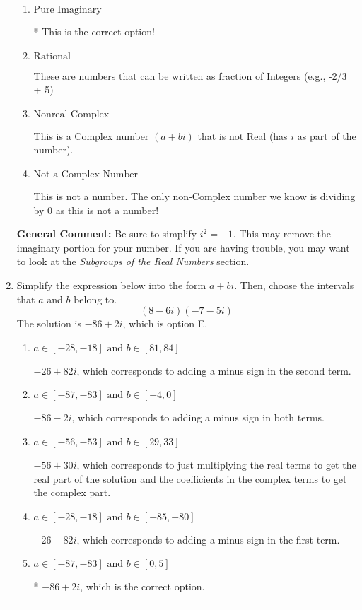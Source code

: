 \documentclass{extbook}[14pt]
\newcommand{\litem}[1]{\item #1

\rule{\textwidth}{0.4pt}}
\begin{document}
\begin{enumerate}
{\begin{enumerate}[label=\Alph*.]
These cannot be written as a fraction of Integers. Remember: $\pi$ is not an Integer!
\item \( \text{Pure Imaginary} \)

* This is the correct option!
\item \( \text{Rational} \)

These are numbers that can be written as fraction of Integers (e.g., -2/3 + 5)
\item \( \text{Nonreal Complex} \)

This is a Complex number $(a+bi)$ that is not Real (has $i$ as part of the number).
\item \( \text{Not a Complex Number} \)

This is not a number. The only non-Complex number we know is dividing by 0 as this is not a number!
\end{enumerate}

\textbf{General Comment:} Be sure to simplify $i^2 = -1$. This may remove the imaginary portion for your number. If you are having trouble, you may want to look at the \textit{Subgroups of the Real Numbers} section.
}
\litem{
Simplify the expression below into the form $a+bi$. Then, choose the intervals that $a$ and $b$ belong to.
\[ (8 - 6 i)(-7 - 5 i) \]The solution is \( -86 + 2 i \), which is option E.\begin{enumerate}[label=\Alph*.]
\item \( a \in [-28, -18] \text{ and } b \in [81, 84] \)

 $-26 + 82 i$, which corresponds to adding a minus sign in the second term.
\item \( a \in [-87, -83] \text{ and } b \in [-4, 0] \)

 $-86 - 2 i$, which corresponds to adding a minus sign in both terms.
\item \( a \in [-56, -53] \text{ and } b \in [29, 33] \)

 $-56 + 30 i$, which corresponds to just multiplying the real terms to get the real part of the solution and the coefficients in the complex terms to get the complex part.
\item \( a \in [-28, -18] \text{ and } b \in [-85, -80] \)

 $-26 - 82 i$, which corresponds to adding a minus sign in the first term.
\item \( a \in [-87, -83] \text{ and } b \in [0, 5] \)

* $-86 + 2 i$, which is the correct option.
\end{enumerate}

}
\end{enumerate}
\end{document}
